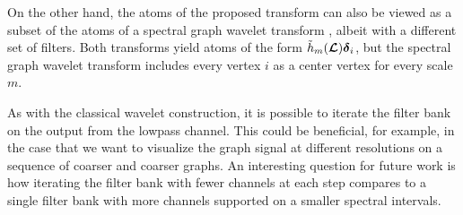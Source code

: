 \documentclass[journal, 10pt]{IEEEtran}
\begin{document}
On the other hand, the atoms of the proposed transform can also be viewed as a subset of the atoms of a spectral graph wavelet transform  \cite{hammond2011wavelets}, albeit with a different set of filters. Both transforms yield atoms of the form $\tilde{h}_m(\boldsymbol{\mathcal{L}}){\boldsymbol \delta}_i$, but the spectral graph wavelet transform includes every vertex $i$ as a center vertex for every scale $m$. 


As with the classical wavelet construction, it is possible to iterate the filter bank on the output from the lowpass channel.
This could be beneficial, for example, in the case that we want to visualize the graph signal at different resolutions on  a sequence of coarser and coarser graphs. An interesting question for future work is how iterating the filter bank with fewer channels at each step compares to a single filter bank with more channels %
supported on a smaller spectral intervals. %
\end{document}
